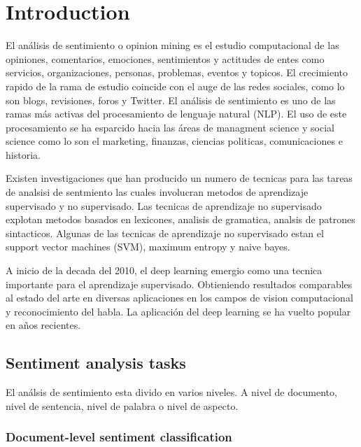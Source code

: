 \section{Introduction}

El análisis de sentimiento o opinion mining es el estudio computacional de las opiniones, comentarios, emociones, sentimientos y actitudes de entes como servicios, organizaciones, personas, problemas, eventos y topicos\cite{Liu_2015}. El crecimiento rapido de la rama de estudio coincide con el auge de las redes sociales, como lo son blogs, revisiones, foros y Twitter. El análisis de sentimiento es uno de las ramas más activas del procesamiento de lenguaje natural (NLP). El uso de este procesamiento se ha esparcido hacia las áreas de managment science y social science como lo son el marketing, finanzas, ciencias politicas, comunicaciones e historia\cite{Chalothom_2015}.

Existen investigaciones que han producido un numero de tecnicas para las tareas de analsisi de sentmiento las cuales involucran metodos de aprendizaje supervisado y no supervisado. Las tecnicas de aprendizaje no supervisado explotan metodos basados en lexicones, analisis de gramatica, analsis de patrones sintacticos. Algunas de las tecnicas de aprendizaje no supervisado estan el support vector machines (SVM), maximum entropy y  naive bayes\cite{Liu_2012,Liu_2015,Lee_2009}.

A inicio de la decada del 2010, el deep learning emergio como una tecnica importante para el aprendizaje supervisado\cite{Goodfellow_2016}. Obtieniendo resultados comparables al estado del arte en diversas aplicaciones en los campos de vision computacional y reconocimiento del habla. La aplicación del deep learning se ha vuelto popular en años recientes.

\subsection{Sentiment analysis tasks}

El análsis de sentimiento esta divido en varios niveles\cite{Thomas_2013}. A nivel de documento\cite{Yessenalina_2010}, nivel de sentencia\cite{Farra_2010}, nivel de palabra\cite{Engonopoulos_2011} o nivel de aspecto\cite{Haochen_2015}.

\subsubsection{Document-level sentiment classification}

